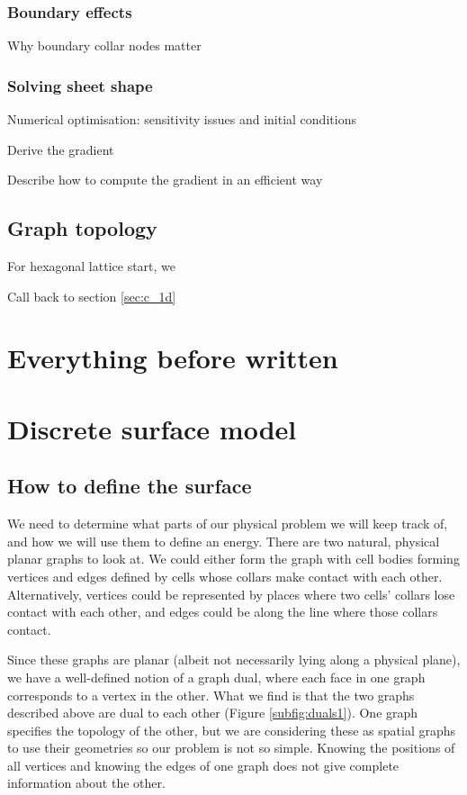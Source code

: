 \subsubsection{Boundary effects}
Why boundary collar nodes matter

\subsubsection{Solving sheet shape}

Numerical optimisation: sensitivity issues and initial conditions

Derive the gradient

Describe how to compute the gradient in an efficient way

\subsection{Graph topology}
For hexagonal lattice start, we 

Call back to section \ref{sec:c_1d}

\section{Everything before written}
\section{Discrete surface model}
\subsection{How to define the surface}

We need to determine what parts of our physical problem we will keep track of, and how we will use them to define an energy. There are two natural, physical planar graphs to look at. We could either form the graph with cell bodies forming vertices and edges defined by cells whose collars make contact with each other. Alternatively, vertices could be represented by places where two cells' collars lose contact with each other, and edges could be along the line where those collars contact. 

Since these graphs are planar (albeit not necessarily lying along a physical plane), we have a well-defined notion of a graph dual, where each face in one graph corresponds to a vertex in the other. What we find is that the two graphs described above are dual to each other (Figure \ref{subfig:duals1}). One graph specifies the topology of the other, but we are considering these as spatial graphs to use their geometries so our problem is not so simple. Knowing the positions of all vertices and knowing the edges of one graph does not give complete information about the other.

